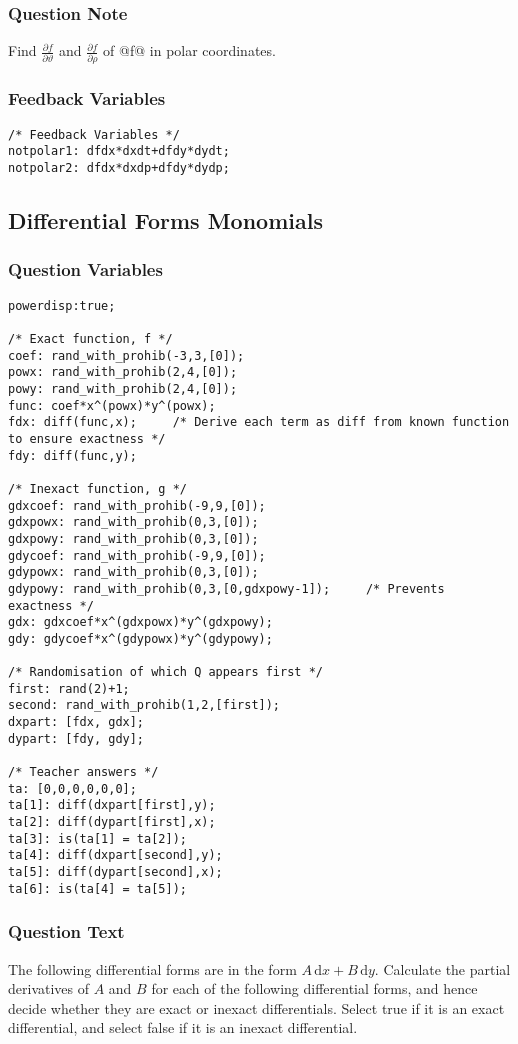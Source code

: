 \documentclass[a4paper,10pt]{article}
\begin{document}
\subsubsection{Question Note}
Find \( \frac{\partial f}{\partial \vartheta} \) and \( \frac{\partial f}{\partial \rho} \) of @f@ in polar coordinates.
\subsubsection{Feedback Variables}
\begin{lstlisting}
/* Feedback Variables */
notpolar1: dfdx*dxdt+dfdy*dydt;
notpolar2: dfdx*dxdp+dfdy*dydp;
\end{lstlisting}

\subsection{Differential Forms Monomials}
\subsubsection{Question Variables}
\begin{lstlisting}
powerdisp:true;

/* Exact function, f */
coef: rand_with_prohib(-3,3,[0]);
powx: rand_with_prohib(2,4,[0]);
powy: rand_with_prohib(2,4,[0]);
func: coef*x^(powx)*y^(powx);
fdx: diff(func,x);     /* Derive each term as diff from known function to ensure exactness */
fdy: diff(func,y);

/* Inexact function, g */
gdxcoef: rand_with_prohib(-9,9,[0]);
gdxpowx: rand_with_prohib(0,3,[0]);
gdxpowy: rand_with_prohib(0,3,[0]);
gdycoef: rand_with_prohib(-9,9,[0]);
gdypowx: rand_with_prohib(0,3,[0]);
gdypowy: rand_with_prohib(0,3,[0,gdxpowy-1]);     /* Prevents exactness */
gdx: gdxcoef*x^(gdxpowx)*y^(gdxpowy);
gdy: gdycoef*x^(gdypowx)*y^(gdypowy);

/* Randomisation of which Q appears first */
first: rand(2)+1;
second: rand_with_prohib(1,2,[first]);
dxpart: [fdx, gdx];
dypart: [fdy, gdy];

/* Teacher answers */
ta: [0,0,0,0,0,0];
ta[1]: diff(dxpart[first],y);
ta[2]: diff(dypart[first],x);
ta[3]: is(ta[1] = ta[2]);
ta[4]: diff(dxpart[second],y);
ta[5]: diff(dypart[second],x);
ta[6]: is(ta[4] = ta[5]);
\end{lstlisting}
\subsubsection{Question Text}
The following differential forms are in the form \(A \, \text{d}x + B \, \text{d}y\). Calculate the partial derivatives of \(A\) and \(B\) for each of the following differential forms, and hence decide whether they are exact or inexact differentials. Select true if it is an exact differential, and select false if it is an inexact differential.
\end{document}
